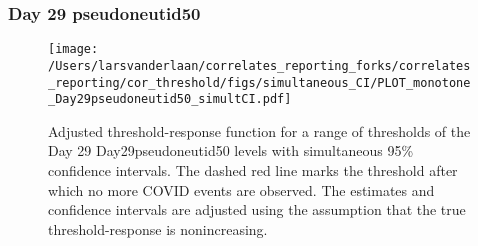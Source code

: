 \documentclass[]{article}
\begin{document}
\clearpage
\clearpage

\clearpage

\hypertarget{day-29-pseudoneutid50-2}{%
\subsubsection{Day 29 pseudoneutid50}\label{day-29-pseudoneutid50-2}}

\begin{figure}[H]
\centering
\texttt{[image: /Users/larsvanderlaan/correlates\_reporting\_forks/correlates\_reporting/cor\_threshold/figs/simultaneous\_CI/PLOT\_monotone\_Day29pseudoneutid50\_simultCI.pdf]}
\caption{Adjusted threshold-response function for a range of thresholds of the
  Day 29 Day29pseudoneutid50 levels with simultaneous 95\% confidence intervals. The dashed red line marks the threshold after which no more COVID events are observed. The estimates and confidence intervals are adjusted using the assumption that the true threshold-response is nonincreasing.}
\end{figure}
\end{document}

